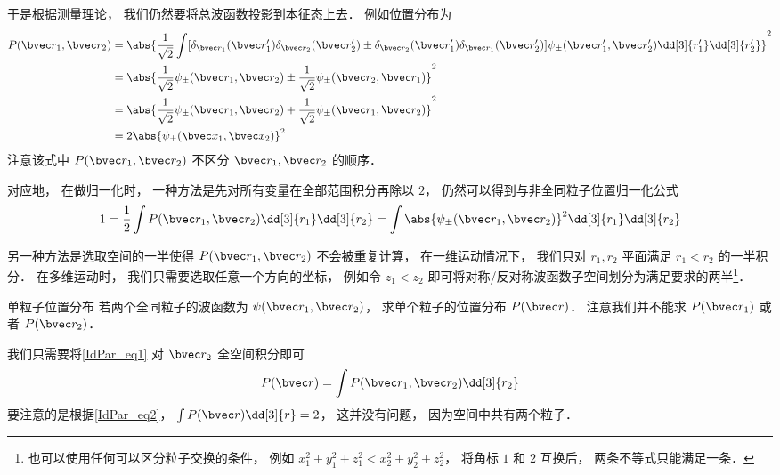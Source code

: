 于是根据测量理论， 我们仍然要将总波函数投影到本征态上去． 例如位置分布为
\begin{equation}\label{IdPar_eq1}
\begin{aligned}
P(\bvec r_1, \bvec r_2) &= \abs{\frac{1}{\sqrt{2}}\int [\delta_{\bvec r_1}(\bvec r'_1) \delta_{\bvec r_2}(\bvec r'_2) \pm \delta_{\bvec r_2}(\bvec r'_1) \delta_{\bvec r_1}(\bvec r'_2)] \psi_\pm(\bvec r'_1,\bvec r'_2) \dd[3]{r'_1}\dd[3]{r'_2}}^2\\
&= \abs{\frac{1}{\sqrt{2}} \psi_\pm(\bvec r_1, \bvec r_2) \pm  \frac{1}{\sqrt{2}} \psi_\pm(\bvec r_2, \bvec r_1)}^2\\
&= \abs{\frac{1}{\sqrt{2}} \psi_\pm(\bvec r_1, \bvec r_2) +  \frac{1}{\sqrt{2}} \psi_\pm(\bvec r_1, \bvec r_2)}^2\\
&= 2\abs{\psi_\pm(\bvec x_1, \bvec x_2)}^2
\end{aligned}
\end{equation}
注意该式中 $P(\bvec r_1, \bvec r_2)$ 不区分 $\bvec r_1, \bvec r_2$ 的顺序．

对应地， 在做归一化时， 一种方法是先对所有变量在全部范围积分再除以 $2$， 仍然可以得到与非全同粒子位置归一化公式
\begin{equation}\label{IdPar_eq2}
1 = \frac{1}{2}\int P(\bvec r_1, \bvec r_2) \dd[3]{r_1}\dd[3]{r_2} = \int \abs{\psi_\pm(\bvec r_1, \bvec r_2)}^2 \dd[3]{r_1}\dd[3]{r_2}
\end{equation}

另一种方法是选取空间的一半使得 $P(\bvec r_1, \bvec r_2)$ 不会被重复计算， 在一维运动情况下， 我们只对 $r_1, r_2$ 平面满足 $r_1 < r_2$ 的一半积分． 在多维运动时， 我们只需要选取任意一个方向的坐标， 例如令 $z_1 < z_2$ 即可将对称/反对称波函数子空间划分为满足要求的两半\footnote{也可以使用任何可以区分粒子交换的条件， 例如 $x_1^2 + y_1^2 + z_1^2 < x_2^2 + y_2^2 + z_2^2$， 将角标 $1$ 和 $2$ 互换后， 两条不等式只能满足一条．}．

\begin{example}{单粒子位置分布}
若两个全同粒子的波函数为 $\psi(\bvec r_1,\bvec r_2)$， 求单个粒子的位置分布 $P(\bvec r)$． 注意我们并不能求 $P(\bvec r_1)$ 或者 $P(\bvec r_2)$．

我们只需要将\autoref{IdPar_eq1} 对 $\bvec r_2$ 全空间积分即可
\begin{equation}
P(\bvec r) = \int P(\bvec r_1, \bvec r_2) \dd[3]{r_2}
\end{equation}
要注意的是根据\autoref{IdPar_eq2}， $\int P(\bvec r) \dd[3]{r} = 2$， 这并没有问题， 因为空间中共有两个粒子．
\end{example}
